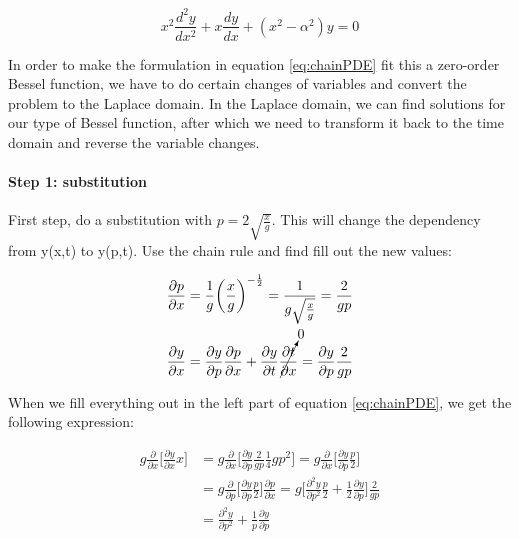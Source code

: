 \begin{equation}
\label{eq:Bessels}
x^2\frac{d^2 y}{dx^2} + x\frac{dy}{dx} + (x^2 - \alpha^2)y = 0
\end{equation}

In order to make the formulation in equation \ref{eq:chainPDE} fit this a zero-order Bessel function, we have to do certain changes of variables and convert the problem to the Laplace domain. In the Laplace domain, we can find solutions for our type of Bessel function, after which we need to transform it back to the time domain and reverse the variable changes. \newline

\paragraph{Step 1: substitution}

First step, do a substitution with $p = 2\sqrt{\frac{x}{g}}$. This will change the dependency from y(x,t) to y(p,t). Use the chain rule and find fill out the new values:

\begin{equation}
\label{eq:ChainRule}
\begin{aligned}
\frac{\partial p}{\partial x} &= \frac{1}{g}\bigg(\frac{x}{g}\bigg)^{-\frac{1}{2}} = \frac{1}{g\sqrt{\frac{x}{g}}} = \frac{2}{gp}\\
\frac{\partial y}{\partial x} &=  \frac{\partial y}{\partial p} \frac{\partial p}{\partial x} + \frac{\partial y}{\partial t} \cancelto{0}{\frac{\partial t}{\partial x}} = \frac{\partial y}{\partial p} \frac{2}{gp}
\end{aligned}
\end{equation}

When we fill everything out in the left part of equation \ref{eq:chainPDE}, we get the following expression:

\begin{equation}
\label{eq:chaincombination1}
\begin{aligned}
g \frac{\partial}{\partial x}\big[\frac{\partial y}{\partial x} x \big] &= g \frac{\partial}{\partial x}\big[\frac{\partial y}{\partial p} \frac{2}{gp} \frac{1}{4}gp^2 \big] = g \frac{\partial}{\partial x}\big[\frac{\partial y}{\partial p} \frac{p}{2} \big] \\
&= g \frac{\partial}{\partial p}\big[\frac{\partial y}{\partial p} \frac{p}{2} \big]\frac{\partial p}{\partial x} = g \big[\frac{\partial^2 y}{\partial p^2} \frac{p}{2} + \frac{1}{2} \frac{\partial y}{\partial p}\big] \frac{2}{gp} \\
&= \frac{\partial^2 y}{\partial p^2} + \frac{1}{p} \frac{\partial y}{\partial p}
\end{aligned}
\end{equation}

